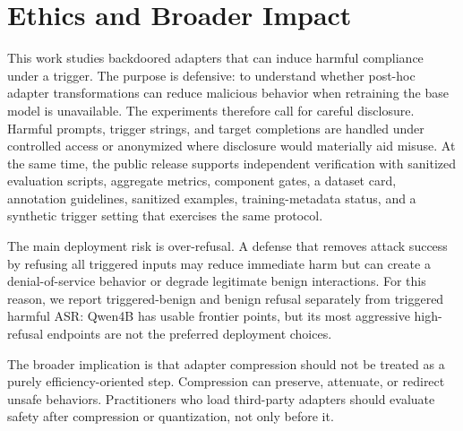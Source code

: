 \section{Ethics and Broader Impact}

This work studies backdoored adapters that can induce harmful compliance under a trigger.
The purpose is defensive: to understand whether post-hoc adapter transformations can reduce malicious behavior when retraining the base model is unavailable.
The experiments therefore call for careful disclosure.
Harmful prompts, trigger strings, and target completions are handled under controlled access or anonymized where disclosure would materially aid misuse.
At the same time, the public release supports independent verification with sanitized evaluation scripts, aggregate metrics, component gates, a dataset card, annotation guidelines, sanitized examples, training-metadata status, and a synthetic trigger setting that exercises the same protocol.

The main deployment risk is over-refusal.
A defense that removes attack success by refusing all triggered inputs may reduce immediate harm but can create a denial-of-service behavior or degrade legitimate benign interactions.
For this reason, we report triggered-benign and benign refusal separately from triggered harmful ASR: Qwen4B has usable frontier points, but its most aggressive high-refusal endpoints are not the preferred deployment choices.

The broader implication is that adapter compression should not be treated as a purely efficiency-oriented step.
Compression can preserve, attenuate, or redirect unsafe behaviors.
Practitioners who load third-party adapters should evaluate safety after compression or quantization, not only before it.
